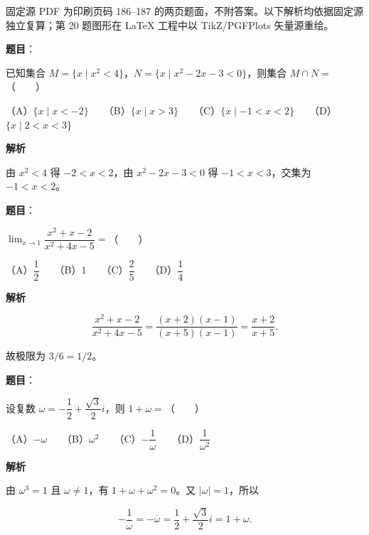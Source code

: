

\begin{gktip}
固定源 PDF 为印刷页码 186–187 的两页题面，不附答案。以下解析均依据固定源独立复算；第 20 题图形在 LaTeX 工程中以 TikZ/PGFPlots 矢量源重绘。
\end{gktip}

\begin{answer}

\textbf{题目}：

已知集合 $M=\{x\mid x^2<4\}$，$N=\{x\mid x^2-2x-3<0\}$，则集合 $M\cap N=$\mbox{（　　）}

（A）$\{x\mid x<-2\}$　　（B）$\{x\mid x>3\}$　　（C）$\{x\mid-1<x<2\}$　　（D）$\{x\mid2<x<3\}$

\textbf{解析}

由 $x^2<4$ 得 $-2<x<2$，由 $x^2-2x-3<0$ 得 $-1<x<3$，交集为 $-1<x<2$。


\end{answer}
\begin{answer}

\textbf{题目}：

$\displaystyle\lim_{x\to1}\dfrac{x^2+x-2}{x^2+4x-5}=$\mbox{（　　）}

（A）$\dfrac12$　　（B）$1$　　（C）$\dfrac25$　　（D）$\dfrac14$

\textbf{解析}

\nopagebreak[4]
\[
\frac{x^2+x-2}{x^2+4x-5}
=\frac{(x+2)(x-1)}{(x+5)(x-1)}
=\frac{x+2}{x+5}.
\]

故极限为 $3/6=1/2$。


\end{answer}
\begin{answer}

\textbf{题目}：

设复数 $\omega=-\dfrac12+\dfrac{\sqrt3}{2}i$，则 $1+\omega=$\mbox{（　　）}

（A）$-\omega$　　（B）$\omega^2$　　（C）$-\dfrac1\omega$　　（D）$\dfrac1{\omega^2}$

\textbf{解析}

由 $\omega^3=1$ 且 $\omega\ne1$，有 $1+\omega+\omega^2=0$。又 $|\omega|=1$，所以

\nopagebreak[4]
\[
-\frac1\omega=-\overline{\omega}
=\frac12+\frac{\sqrt3}{2}i
=1+\omega.
\]


\end{answer}
